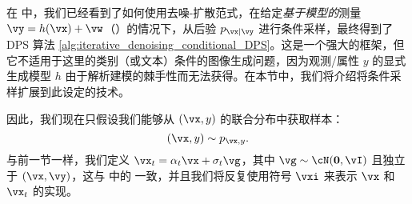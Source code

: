 \documentclass[../../book-main_zh.tex]{subfiles}
\begin{document}
在  中，我们已经看到了如何使用去噪-扩散范式，在给定\textit{基于模型的}测量 $\vy = h(\vx) + \vw$（）的情况下，从后验 $p_{\vx \mid \vy}$ 进行条件采样，最终得到了 DPS 算法 \eqref{alg:iterative_denoising_conditional_DPS}。这是一个强大的框架，但它不适用于这里的类别（或文本）条件的图像生成问题，因为观测/属性 $y$ 的显式生成模型 $h$ 由于解析建模的棘手性而无法获得。在本节中，我们将介绍将条件采样扩展到此设定的技术。


因此，我们现在只假设我们能够从 $(\vx, y)$ 的联合分布中获取样本：
\begin{equation}
  (\vx, y) \sim p_{\vx, y}.
\end{equation}
与前一节一样，我们定义 $\vx_t = \alpha_t \vx + \sigma_t \vg$，其中 $\vg \sim \cN(\Zero, \vI)$ 且独立于 $(\vx, \vy)$，这与  中的  一致，并且我们将反复使用符号 $\vxi$ 来表示 $\vx$ 和 $\vx_t$ 的实现。
\end{document}
